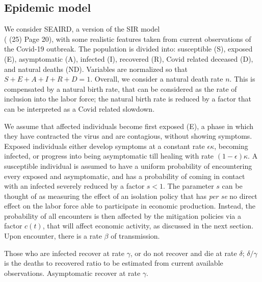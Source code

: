 \documentclass{amsart}
\begin{document}
\subsection{Epidemic model } \label{epidemic model}

We consider SEAIRD, a  version of the SIR model \\(\cite{CHBC-C} (25) Page 20),
with some realistic features taken from current observations
of the Covid-19 outbreak.
The population is divided into: susceptible (S), exposed (E),
asymptomatic (A),
infected (I), recovered (R), Covid related deceased (D),
and natural deaths (ND).
Variables are normalized so that $S+E+A+I+R+D=1$. 
Overall,  we consider  a natural death rate $n$. This is compensated
by a natural birth rate, that  can be considered as
the rate of inclusion into the labor force; 
the natural birth rate is reduced by a factor that
can be interpreted as a Covid related slowdown.

 
We assume that affected individuals become first exposed (E),
a phase  in which they have contracted the virus and are contagious, without showing symptoms. Exposed individuals either develop 
symptoms at a constant
rate $\epsilon \kappa$, becoming infected, or progress into being asymptomatic 
till healing with rate $(1-\epsilon ) \kappa$.
A susceptible 
individual is assumed to have a uniform probability of encountering
every exposed and asymptomatic, and has a  probability of 
coming in contact with an infected severely 
reduced by a factor $s<1$. The parameter $s$ can be thought of as measuring the effect of an isolation policy that has \textit{per se} no direct effect on the labor force able to participate in economic production. Instead, the probability of all
encounters  is then affected by the mitigation policies via a factor $c(t)$, that will affect economic activity, as discussed in the next section.
Upon encounter, there is a
rate $\beta$ of transmission.


Those who are infected  recover at  rate $\gamma$, 
or do not recover and die at rate $\delta$; 
$\delta/\gamma$ is the   deaths to recovered ratio 
to be estimated from 
current available observations.
Asymptomatic recover at rate $\gamma$.
\end{document}
